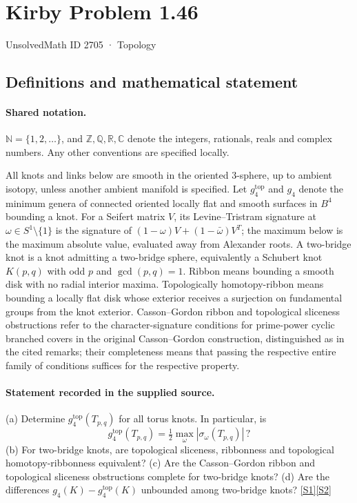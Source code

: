 \documentclass[11pt]{article}
\newcommand{\sref}[2]{\hyperlink{source:#1:#2}{[S#2]}}
\begin{document}
\setcounter{section}{2704}
\section{Kirby Problem 1.46}\label{2705}
{\small\sffamily UnsolvedMath ID 2705 · Topology}
\subsection{Definitions and mathematical statement}

\paragraph{Shared notation.}$\mathbb N=\{1,2,\ldots\}$, and $\mathbb Z,\mathbb Q,\mathbb R,\mathbb C$ denote the integers, rationals, reals and complex numbers. Any other conventions are specified locally.


All knots and links below are smooth in the oriented $3$-sphere, up to ambient isotopy, unless another ambient manifold is specified. Let $g_4^{\mathrm{top}}$ and $g_4$ denote the minimum genera of connected oriented locally flat and smooth surfaces in $B^4$ bounding a knot. For a Seifert matrix $V$, its Levine--Tristram signature at $\omega\in S^1\setminus\{1\}$ is the signature of $(1-\omega)V+(1-\bar\omega)V^T$; the maximum below is the maximum absolute value, evaluated away from Alexander roots. A two-bridge knot is a knot admitting a two-bridge sphere, equivalently a Schubert knot $K(p,q)$ with odd $p$ and $\gcd(p,q)=1$. Ribbon means bounding a smooth disk with no radial interior maxima. Topologically homotopy-ribbon means bounding a locally flat disk whose exterior receives a surjection on fundamental groups from the knot exterior. Casson--Gordon ribbon and topological sliceness obstructions refer to the character-signature conditions for prime-power cyclic branched covers in the original Casson--Gordon construction, distinguished as in the cited remarks; their completeness means that passing the respective entire family of conditions suffices for the respective property.
\paragraph{Statement recorded in the supplied source.}
(a) Determine $g_4^{\mathrm{top}}(T_{p,q})$ for all torus knots. In particular, is\[g_4^{\mathrm{top}}(T_{p,q})=\tfrac12\max_\omega|\sigma_\omega(T_{p,q})|\,?\] (b) For two-bridge knots, are topological sliceness, ribbonness and topological homotopy-ribbonness equivalent? (c) Are the Casson--Gordon ribbon and topological sliceness obstructions complete for two-bridge knots? (d) Are the differences $g_4(K)-g_4^{\mathrm{top}}(K)$ unbounded among two-bridge knots? \sref{2705}{1}\sref{2705}{2}
\end{document}
